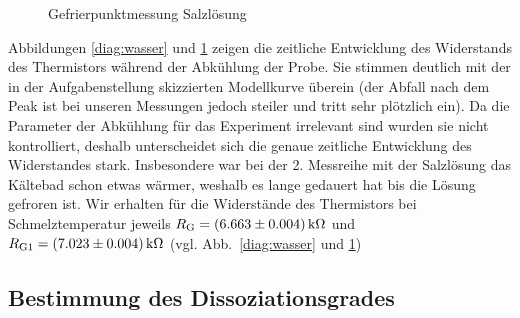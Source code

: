 \begin{figure}    
    
    \caption{Gefrierpunktmessung Salzlösung}
    \label{diag:salz}
\end{figure}

Abbildungen \ref{diag:wasser} und \ref{diag:salz} zeigen die zeitliche Entwicklung des Widerstands des Thermistors während der Abkühlung der Probe. Sie stimmen deutlich mit der in der Aufgabenstellung skizzierten Modellkurve überein (der Abfall nach dem Peak ist bei unseren Messungen jedoch steiler und tritt sehr plötzlich ein). 
Da die Parameter der Abkühlung für das Experiment irrelevant sind wurden sie nicht kontrolliert, deshalb unterscheidet sich die genaue zeitliche Entwicklung des Widerstandes stark. Insbesondere war bei der 2. Messreihe mit der Salzlösung das Kältebad schon etwas wärmer, weshalb es lange gedauert hat bis die Lösung gefroren ist.
%
Wir erhalten für die Widerstände des Thermistors bei Schmelztemperatur jeweils $R_\mathrm{G} = \unit[(6.663 \pm 0.004)]{k\Omega}$ und $R_\mathrm{G1} = \unit[(7.023 \pm 0.004)]{k\Omega}$ (vgl. Abb.~\ref{diag:wasser} und \ref{diag:salz})

\subsection{Bestimmung des Dissoziationsgrades}

